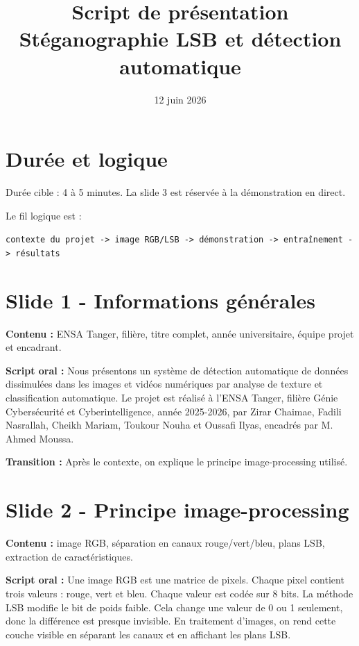 \documentclass[11pt,a4paper]{article}
\title{\textbf{Script de présentation}\\Stéganographie LSB et détection automatique}
\date{12 juin 2026}
\begin{document}
\maketitle

\section*{Durée et logique}
Durée cible : 4 à 5 minutes. La slide 3 est réservée à la démonstration en direct.

Le fil logique est :
\begin{center}
\texttt{contexte du projet -> image RGB/LSB -> démonstration -> entraînement -> résultats}
\end{center}

\section{Slide 1 - Informations générales}
\textbf{Contenu :} ENSA Tanger, filière, titre complet, année universitaire, équipe projet et encadrant.

\textbf{Script oral :} Nous présentons un système de détection automatique de données dissimulées dans les images et vidéos numériques par analyse de texture et classification automatique. Le projet est réalisé à l'ENSA Tanger, filière Génie Cybersécurité et Cyberintelligence, année 2025-2026, par Zirar Chaimae, Fadili Nasrallah, Cheikh Mariam, Toukour Nouha et Oussafi Ilyas, encadrés par M. Ahmed Moussa.

\textbf{Transition :} Après le contexte, on explique le principe image-processing utilisé.

\section{Slide 2 - Principe image-processing}
\textbf{Contenu :} image RGB, séparation en canaux rouge/vert/bleu, plans LSB, extraction de caractéristiques.

\textbf{Script oral :} Une image RGB est une matrice de pixels. Chaque pixel contient trois valeurs : rouge, vert et bleu. Chaque valeur est codée sur 8 bits. La méthode LSB modifie le bit de poids faible. Cela change une valeur de 0 ou 1 seulement, donc la différence est presque invisible. En traitement d'images, on rend cette couche visible en séparant les canaux et en affichant les plans LSB.
\end{document}
